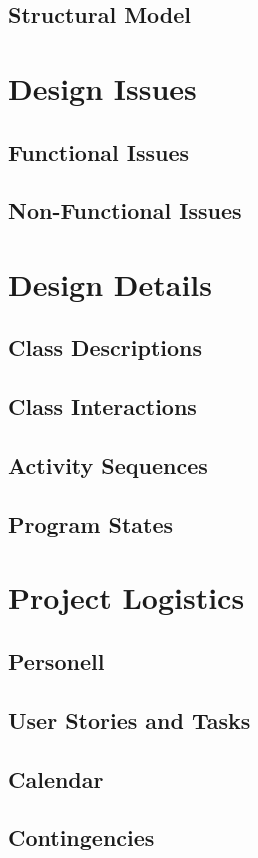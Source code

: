 \documentclass[12pt]{article}
\begin{document}
\subsection{Structural Model}




\section{Design Issues}

\subsection{Functional Issues}

\subsection{Non-Functional Issues}




\section{Design Details}

\subsection{Class Descriptions}

\subsection{Class Interactions}

\subsection{Activity Sequences}

\subsection{Program States}


\section{Project Logistics}

\subsection{Personell}

\subsection{User Stories and Tasks}

\subsection{Calendar}

\subsection{Contingencies}
\end{document}
